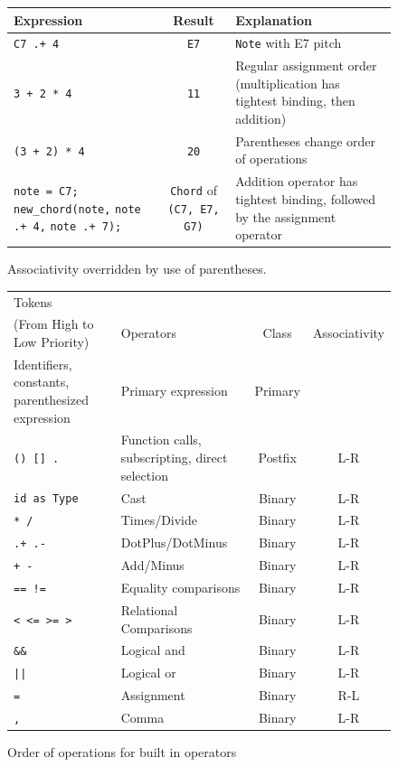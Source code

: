 \documentclass[12pt,A4]{book}
\begin{document}
\begin{figure}
\center
\begin{tabular}{|p{}|c|p{}|}
\hline
Expression & Result & Explanation \\ \hline
\verb|C7 .+ 4| & \verb|E7| & \verb|Note| with E7 pitch \\ \hline
\verb|3 + 2 * 4| & \verb|11| &	Regular assignment order (multiplication has tightest binding, then addition) \\ \hline
\verb|(3 + 2) * 4| &\verb|20| & Parentheses change order of operations \\ \hline
\verb|note = C7;| \verb|new_chord(note,| \verb|note .+ 4,| \verb|note .+ 7);| & \verb|Chord| of \verb|(C7, E7, G7)| & Addition operator has tightest binding, followed by the assignment operator \\ \hline
\end{tabular}
\label{fig:associativity}
\caption{Associativity overridden by use of parentheses.}
\end{figure}

\begin{figure}
\center
\begin{tabular}{|p{}|p{}|c|c|}
\hline
Tokens\\(From High to Low Priority) & Operators & Class & Associativity \\ \hline
Identifiers, constants, parenthesized expression & Primary expression & Primary	& \\ \hline
\verb|() [] .|	& Function calls, subscripting, direct selection & Postfix & L-R \\ \hline
\verb|id as Type| & Cast & Binary & L-R \\ \hline
\verb|* /| &	Times/Divide	& Binary &	L-R \\ \hline
\verb|.+ .-| &	DotPlus/DotMinus	& Binary &	L-R \\ \hline
\verb|+ -| &	Add/Minus	& Binary &	L-R \\ \hline
\verb|== !=| & Equality comparisons & Binary & L-R \\ \hline
\verb|< <= >= >| & Relational Comparisons & Binary & L-R \\ \hline
\verb|&&| &	Logical and	& Binary	& L-R \\ \hline
\verb.||.	& Logical or & Binary & L-R \\ \hline
\verb|=| &	Assignment  & 	Binary & R-L \\ \hline
\verb|,| & Comma & Binary & L-R \\ \hline
\end{tabular}
\label{fig:order_of_operations}
\caption{Order of operations for built in operators}
\end{figure}
\end{document}
